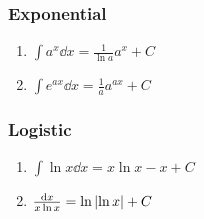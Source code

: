 \subsubsection{Exponential}
	\begin{enumerate}
		\item$\int a^x\dd{x}=\frac{1}{\ln a}a^x+C$
		\item$\int e^{ax}\dd{x}=\frac{1}{a}a^{ax}+C$
	\end{enumerate}
\subsubsection{Logistic}
	\begin{enumerate}
		\item$\int\ln x\dd{x}=x\ln x-x+C$
		\item$\frac{\dd{x}}{x\ln x}=\ln\abs{\ln x}+C$
	\end{enumerate}
